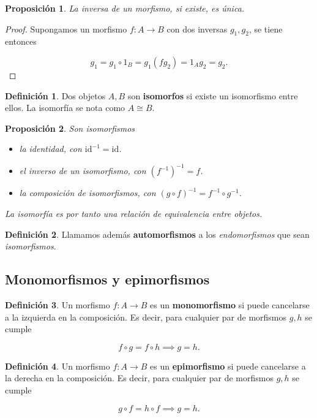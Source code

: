 \documentclass[11pt]{article}
\theoremstyle{plain}
\newtheorem{fact}{Proposición}
\theoremstyle{definition}
\newtheorem{definition}{Definición}
\theoremstyle{remark}
\begin{document}
\begin{fact}
La inversa de un morfismo, si existe, es única.
\end{fact}
\begin{proof}
Supongamos un morfismo \(f\colon A \to B\) con dos inversas \(g_1,g_2\), se tiene entonces

\[g_1 = g_1\circ 1_B = g_1(fg_2) = 1_Ag_2 = g_2
.\] \cite{aluffi09_prelim}
\end{proof}

\begin{definition}
Dos objetos \(A,B\) son \textbf{isomorfos} si existe un isomorfismo entre
ellos. La isomorfía se nota como \(A \cong B\).
\end{definition}

\begin{fact}
Son isomorfismos

\begin{itemize}
\item la identidad, con \(\mathrm{id}^{-1} = \mathrm{id}\).
\item el inverso de un isomorfismo, con \(\left( f^{-1} \right)^{-1} = f\).
\item la composición de isomorfismos, con \(\left( g\circ f \right)^{-1} = f^{-1} \circ g^{-1}\).
\end{itemize}

La isomorfía es por tanto una relación de equivalencia entre objetos.
\end{fact}

\begin{definition}
Llamamos además \textbf{automorfismos} a los \emph{endomorfismos} que sean
\emph{isomorfismos}.
\end{definition}

\subsection{Monomorfismos y epimorfismos}
\label{sec:org5c609e9}
\begin{definition}
Un morfismo \(f\colon A \to B\) es un \textbf{monomorfismo} si puede cancelarse a la izquierda
en la composición. Es decir, para cualquier par de morfismos \(g,h\) se cumple

\[
f \circ g = f \circ h \implies g = h.
\]
\end{definition}

\begin{definition}
Un morfismo \(f\colon A \to B\) es un \textbf{epimorfismo} si puede cancelarse a la derecha
en la composición. Es decir, para cualquier par de morfismos \(g,h\) se cumple

\[
g \circ f = h \circ f \implies g = h.
\]
\end{definition}
\end{document}

